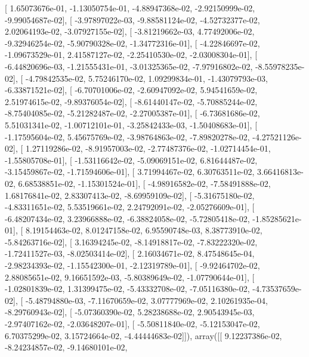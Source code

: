 \documentclass{article}
\begin{document}
       [  1.65073676e-01,  -1.13050754e-01,  -4.88947368e-02,
         -2.92150999e-02,  -9.99054687e-02],
       [ -3.97897022e-03,  -9.88581124e-02,  -4.52732377e-02,
          2.02064193e-02,  -3.07927155e-02],
       [ -3.81219662e-03,   4.77492006e-02,  -9.32946254e-02,
         -5.90790328e-02,  -1.34772316e-01],
       [ -4.22846697e-02,  -1.09673529e-01,   2.41587127e-02,
         -2.25410530e-02,  -2.03008304e-01],
       [ -6.44820696e-03,  -1.21555431e-01,  -3.01325365e-02,
         -7.97916802e-02,  -8.55978235e-02],
       [ -4.79842535e-02,   5.75246170e-02,   1.09299834e-01,
         -1.43079793e-03,  -6.33871521e-02],
       [ -6.70701006e-02,  -2.60947092e-02,   5.94541659e-02,
          2.51974615e-02,  -9.89376054e-02],
       [ -8.61440147e-02,  -5.70885244e-02,  -8.75404085e-02,
         -5.21282487e-02,  -2.27005387e-01],
       [ -6.73681686e-02,   5.51031341e-02,  -1.00712101e-01,
         -3.25842433e-03,  -1.50408683e-01],
       [ -1.17595604e-02,   5.45675769e-02,  -3.98764863e-02,
         -7.89820278e-02,  -4.27521126e-02],
       [  1.27119286e-02,  -8.91957003e-02,  -2.77487376e-02,
         -1.02714454e-01,  -1.55805708e-01],
       [ -1.53116642e-02,  -5.09069151e-02,   6.81644487e-02,
         -3.15459867e-02,  -1.71594606e-01],
       [  3.71994467e-02,   6.30763511e-02,   3.66416813e-02,
          6.68538851e-02,  -1.15301524e-01],
       [ -4.98916582e-02,  -7.58491888e-02,   1.68176841e-02,
          2.83307413e-02,  -8.69959109e-02],
       [ -5.31675180e-02,  -4.83311651e-02,   5.53519661e-02,
          2.24792091e-02,  -2.05276609e-01],
       [ -6.48207434e-02,   3.23966888e-02,  -6.38824058e-02,
         -5.72805418e-02,  -1.85285621e-01],
       [  8.19154463e-02,   8.01247158e-02,   6.95590748e-03,
          8.38773910e-02,  -5.84263716e-02],
       [  3.16394245e-02,  -8.14918817e-02,  -7.83222320e-02,
         -1.72411527e-03,  -8.02503414e-02],
       [  2.16034671e-02,   8.47548645e-04,  -2.98234393e-02,
         -1.15542300e-01,  -2.12319789e-01],
       [ -9.92464702e-02,   2.88085651e-02,   9.16651592e-03,
         -5.80389649e-02,  -1.07790644e-01],
       [ -1.02801839e-02,   1.31399475e-02,  -5.43332708e-02,
         -7.05116380e-02,  -4.73537659e-02],
       [ -5.48794880e-03,  -7.11670659e-02,   3.07777969e-02,
          2.10261935e-04,  -8.29760943e-02],
       [ -5.07360390e-02,   5.28238688e-02,   2.90543945e-03,
         -2.97407162e-02,  -2.03648207e-01],
       [ -5.50811840e-02,  -5.12153047e-02,   6.70375299e-02,
          3.15724664e-02,  -4.44444683e-02]]), array([[  9.12237386e-02,  -8.24234857e-02,  -9.14680101e-02,
\end{document}

